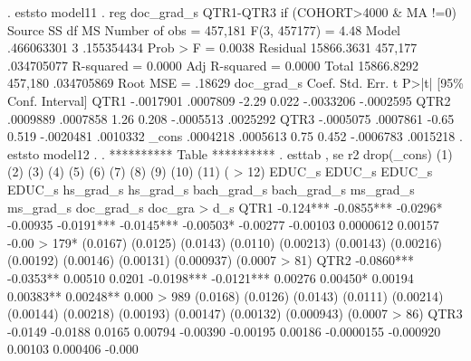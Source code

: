 {\smallskip}
. eststo model11
{\smallskip}
. reg doc_grad_s QTR1-QTR3  if (COHORT>4000 \& MA !=0)
{\smallskip}
      Source {\VBAR}       SS           df       MS      Number of obs   =   457,181
   F(3, 457177)    =      4.48
       Model {\VBAR}  .466063301         3  .155354434   Prob > F        =    0.0038
    Residual {\VBAR}  15866.3631   457,177  .034705077   R-squared       =    0.0000
   Adj R-squared   =    0.0000
       Total {\VBAR}  15866.8292   457,180  .034705869   Root MSE        =    .18629
{\smallskip}
  doc_grad_s {\VBAR}      Coef.   Std. Err.      t    P>|t|     [95\% Conf. Interval]
        QTR1 {\VBAR}  -.0017901   .0007809    -2.29   0.022    -.0033206   -.0002595
        QTR2 {\VBAR}   .0009889   .0007858     1.26   0.208    -.0005513    .0025292
        QTR3 {\VBAR}  -.0005075   .0007861    -0.65   0.519    -.0020481    .0010332
       _cons {\VBAR}   .0004218   .0005613     0.75   0.452    -.0006783    .0015218
{\smallskip}
. eststo model12
{\smallskip}
. 
. ********** Table **********
. esttab , se r2 drop(_cons) 
{\smallskip}
                      (1)             (2)             (3)             (4)             (5)             (6)             (7)             (8)             (9)            (10)            (11)            (
> 12)   
                   EDUC_s          EDUC_s          EDUC_s          EDUC_s       hs_grad_s       hs_grad_s     bach_grad_s     bach_grad_s       ms_grad_s       ms_grad_s      doc_grad_s      doc_gra
> d_s   
QTR1               -0.124***      -0.0855***      -0.0296*       -0.00935         -0.0191***      -0.0145***     -0.00503*       -0.00277        -0.00103       0.0000612         0.00157        -0.00
> 179*  
                 (0.0167)        (0.0125)        (0.0143)        (0.0110)       (0.00213)       (0.00143)       (0.00216)       (0.00192)       (0.00146)       (0.00131)      (0.000937)      (0.0007
> 81)   
{\smallskip}
QTR2              -0.0860***      -0.0353**       0.00510          0.0201         -0.0198***      -0.0121***      0.00276         0.00450*        0.00194         0.00383**       0.00248**      0.000
> 989   
                 (0.0168)        (0.0126)        (0.0143)        (0.0111)       (0.00214)       (0.00144)       (0.00218)       (0.00193)       (0.00147)       (0.00132)      (0.000943)      (0.0007
> 86)   
{\smallskip}
QTR3              -0.0149         -0.0188          0.0165         0.00794        -0.00390        -0.00195         0.00186      -0.0000155       -0.000920         0.00103        0.000406       -0.000
